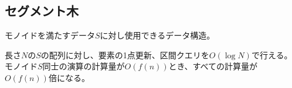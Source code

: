 \subsection{セグメント木}

モノイドを満たすデータ$S$に対し使用できるデータ構造。

長さ$N$の$S$の配列に対し、要素の1点更新、区間クエリを$O(\log N)$で行える。
モノイド$S$同士の演算の計算量が$O(f(n))$とき、すべての計算量が$O(f(n))$倍になる。



